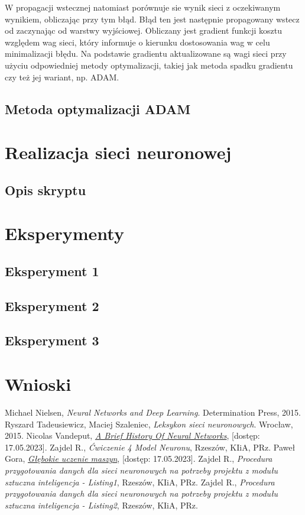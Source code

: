 \documentclass{article}
\begin{document}
W propagacji wstecznej natomiast porównuje sie wynik sieci z oczekiwanym wynikiem, obliczając przy tym błąd.
Błąd ten jest następnie propagowany wstecz od zaczynając od warstwy wyjściowej.
Obliczany jest gradient funkcji kosztu względem wag sieci, który informuje o kierunku dostosowania wag w celu minimalizacji błędu.
Na podstawie gradientu aktualizowane są wagi sieci przy użyciu odpowiedniej metody optymalizacji, takiej jak metoda spadku gradientu czy też jej wariant, np. ADAM.



\subsection{Metoda optymalizacji ADAM}
\section{Realizacja sieci neuronowej}
\subsection{Opis skryptu}
\section{Eksperymenty}
\subsection{Eksperyment 1}
\subsection{Eksperyment 2}
\subsection{Eksperyment 3}
\section{Wnioski}
\begin{thebibliography}{9}
    Michael Nielsen,
    \emph{Neural Networks and Deep Learning}.
    Determination Press,
    2015.
    Ryszard Tadeusiewicz, Maciej Szaleniec,
    \emph{Leksykon sieci neuronowych}.
    Wrocław,
    2015.
    Nicolas Vandeput,
    \href{https://medium.com/analytics-vidhya/a-brief-history-of-neural-networks-c234639a43f1}{\emph{A Brief History Of Neural Networks}},
    [dostęp: 17.05.2023].
    Zajdel R.,
    \emph{Ćwiczenie 4 Model Neuronu},
    Rzeszów,
    KIiA, PRz.
    Paweł Gora,
    \href{https://www.deltami.edu.pl/temat/informatyka/sztuczna_inteligencja/2017/12/28/Glebokie_uczenie_maszyn/}{\emph{Głębokie uczenie maszyn}},
    [dostęp: 17.05.2023].
    Zajdel R.,
    \emph{Procedura przygotowania danych dla sieci neuronowych na potrzeby projektu z modułu sztuczna inteligencja - Listing1},
    Rzeszów,
    KIiA, PRz.
    Zajdel R.,
    \emph{Procedura przygotowania danych dla sieci neuronowych na potrzeby projektu z modułu sztuczna inteligencja - Listing2},
    Rzeszów,
    KIiA, PRz.
\end{thebibliography}
\end{document}
